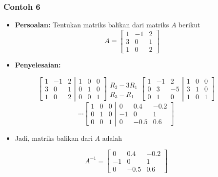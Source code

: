 \documentclass[pdflatex,compress,mathserif]{beamer}
\begin{document}
\begin{frame}
	\frametitle{Contoh 6}
	\begin{itemize}
		\item \textbf{Persoalan:} Tentukan matriks balikan dari matriks $ A $ berikut
		\[ A = \begin{bmatrix}
			1 & -1 & 2 \\
			3 & 0 & 1 \\
			1 & 0 & 2
		\end{bmatrix} \]
	\end{itemize}
\end{frame}

\begin{frame}
	\begin{itemize}
		\item \textbf{Penyelesaian:}
	\end{itemize}
	\[
	\left[
		\begin{matrix}
			1 & -1 & 2 \\
			3 & 0 & 1 \\
			1 & 0 & 2
		\end{matrix}
	\right|
	\left.
		\begin{matrix}
			1 & 0 & 0 \\
			0 & 1 & 0 \\
			0 & 0 & 1
		\end{matrix}
	\right]
	\begin{matrix}
		\\
		R_2 - 3R_1 \\
		R_3 - R_1
	\end{matrix}
	\left[
		\begin{matrix}
			1 & -1 & 2 \\
			0 & 3 & -5 \\
			0 & 1 & 0
		\end{matrix}
	\right|
	\left.
		\begin{matrix}
			1 & 0 & 0 \\
			3 & 1 & 0 \\
			1 & 0 & 1
		\end{matrix}
	\right]
	\]
	\[
	\cdots
	\left[
		\begin{matrix}
		1 & 0 & 0 \\
		0 & 1 & 0 \\
		0 & 0 & 1
		\end{matrix}
	\right|
	\left.
		\begin{matrix}
		0 & 0.4 & -0.2 \\
		-1 & 0 & 1 \\
		0 & -0.5 & 0.6
		\end{matrix}
	\right]
	\]
	\begin{itemize}
		\item[] Jadi, matriks balikan dari $ A $ adalah
	\end{itemize}
	\[
	A^{-1} = 
	\begin{bmatrix}
		0 & 0.4 & -0.2 \\
		-1 & 0 & 1 \\
		0 & -0.5 & 0.6
	\end{bmatrix}
	\]
\end{frame}
\end{document}
